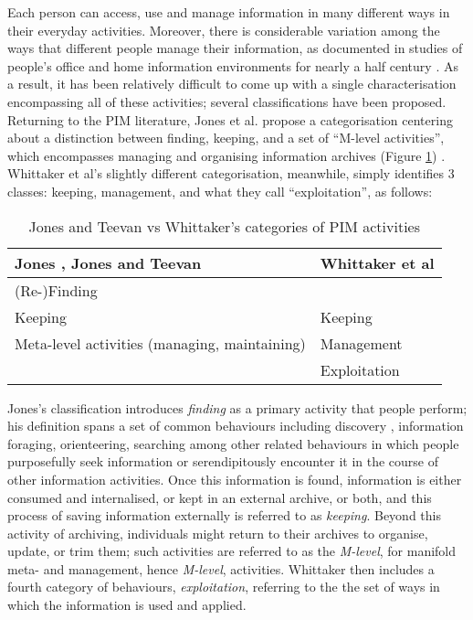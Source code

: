 \documentclass[graybox]{svmult}
\begin{document}
Each person can access, use and manage information in many different ways in their everyday activities.  Moreover, there is considerable variation among the ways that different people manage their information, as documented in studies of people's office and home information environments for nearly a half century \cite{filerspilers}.  As a result, it has been relatively difficult to come up with a single characterisation encompassing all of these activities; several classifications have been proposed.  Returning to the PIM literature, Jones et al. propose a categorisation centering about a distinction between finding, keeping, and a set of ``M-level activities'', which encompasses managing and organising information archives (Figure \ref{fig:pimactivities}) \cite{kftf}. Whittaker et al's slightly different categorisation, meanwhile, simply identifies 3 classes: keeping, management, and what they call ``exploitation'', as follows:

\begin{table}
\begin{center}
\begin{tabular}{p{4.5cm} | p{4.5cm}} 
Jones \cite{jones}, Jones and Teevan \cite{jonesteevan}& Whittaker et al \cite{whittaker}\\
\hline
(Re-)Finding &  \\
Keeping & Keeping \\
Meta-level activities (managing, maintaining) & Management \\
 & Exploitation \\
\end{tabular}
\caption{Jones and Teevan vs Whittaker's categories of PIM activities}
\label{fig:pimactivities}
\end{center}
\end{table}

Jones's classification introduces \emph{finding} as a primary activity that people perform; his definition spans a set of common behaviours including discovery \cite{}, information foraging\cite{}, orienteering\cite{}, searching\cite{} among other related behaviours in which people purposefully seek information or serendipitously encounter it in the course of other information activities.  Once this information is found, information is either consumed and internalised, or kept in an external archive, or both, and this process of saving information externally is referred to as \emph{keeping}.  Beyond this activity of archiving, individuals might return to their archives to organise, update, or trim them; such activities are referred to as the \emph{M-level}, for manifold meta- and management, hence \emph{M-level}, activities.  Whittaker then includes a fourth category of behaviours, \emph{exploitation}, referring to the the set of ways in which the information is used and applied.
\end{document}
